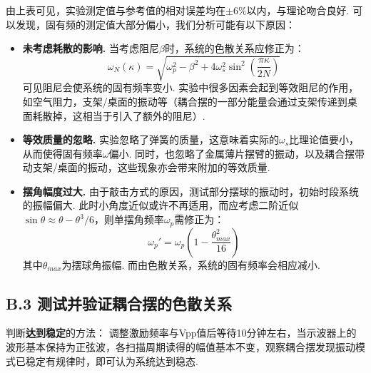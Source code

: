 \documentclass{ctexart}
\begin{document}
由上表可见，实验测定值与参考值的相对误差均在$\pm 6\%$以内，与理论吻合良好. 可以发现，固有频的测定值大部分偏小，我们分析可能有以下原因：
\begin{itemize}
  \item \textbf{未考虑耗散的影响.}  当考虑阻尼$\beta$时，系统的色散关系应修正为：
  \begin{equation*}
    \omega_N(\kappa)=\sqrt{\omega_p^2-\beta^2+4\omega_s^2\sin^2\left(\frac{\pi\kappa}{2N}\right)}
  \end{equation*}
  可见阻尼会使系统的固有频率变小. 实验中很多因素会起到等效阻尼的作用，如空气阻力，支架/桌面的振动等（耦合摆的一部分能量会通过支架传递到桌面耗散掉，这相当于引入了额外的阻尼）.\\
  \item \textbf{等效质量的忽略.} 实验忽略了弹簧的质量，这意味着实际的$\omega_s$比理论值要小，从而使得固有频率$\omega$偏小. 同时，也忽略了金属薄片摆臂的振动，以及耦合摆带动支架/桌面的振动，这些现象亦会带来附加的等效质量.
  \item \textbf{摆角幅度过大.} 由于敲击方式的原因，测试部分摆球的振动时，初始时段系统的振幅偏大. 此时小角度近似或许不再适用，而应考虑二阶近似$\sin\theta\approx\theta-\theta^3/6$，则单摆角频率$\omega_p$需修正为：
  \begin{equation*}
    \omega_p'=\omega_p \left(1-\frac{\theta_{max}^2}{16}\right)
  \end{equation*}
  其中$\theta_{max}$为摆球角振幅. 而由色散关系，系统的固有频率会相应减小.
\end{itemize}
\subsection*{B.3 测试并验证耦合摆的色散关系}
 判断\textbf{达到稳定}的方法： 调整激励频率与Vpp值后等待10分钟左右，当示波器上的波形基本保持为正弦波，各扫描周期读得的幅值基本不变，观察耦合摆发现振动模式已稳定有规律时，即可认为系统达到稳态.
\end{document}
